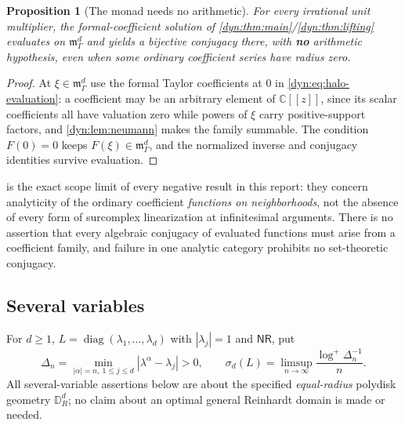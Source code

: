 \documentclass[11pt,letterpaper]{article}
\newtheorem{proposition}[proposition]{Proposition}
\theoremstyle{definition}
\theoremstyle{remark}
\newcommand{\C}{\mathbb C}
\newcommand{\m}{\mathfrak m}
\newcommand{\nres}{\mathsf{NR}}
\numberwithin{equation}{section}
\begin{document}
\begin{proposition}[The monad needs no arithmetic]\label{dyn:prop:monad}
For every irrational unit multiplier, the formal-coefficient solution of
\cref{dyn:thm:main}/\cref{dyn:thm:lifting} evaluates on $\m_\Gamma^{d}$ and
yields a \emph{bijective} conjugacy there, with \textbf{no} arithmetic
hypothesis, even when some ordinary coefficient series have radius zero.
\end{proposition}
\begin{proof}
At $\xi\in\m_\Gamma^{d}$ use the formal Taylor coefficients at $0$ in
\eqref{dyn:eq:halo-evaluation}: a coefficient may be an arbitrary element
of $\C[[z]]$, since its scalar coefficients all have valuation zero while
powers of $\xi$ carry positive-support factors, and
\cref{dyn:lem:neumann} makes the family summable. The condition $F(0)=0$
keeps $F(\xi)\in\m_\Gamma^{d}$, and the normalized inverse and conjugacy
identities survive evaluation.
\end{proof}

 is the exact scope limit of every negative result in
this report: they concern analyticity of the ordinary coefficient
\emph{functions on neighborhoods}, not the absence of every form of
surcomplex linearization at infinitesimal arguments. There is no assertion
that every algebraic conjugacy of evaluated functions must arise from a
coefficient family, and failure in one analytic category prohibits no
set-theoretic conjugacy.

\subsection{Several variables}
\label{dyn:subsec:several}

For $d\ge1$, $L=\operatorname{diag}(\lambda_1,\dots,\lambda_d)$ with
$|\lambda_j|=1$ and $\nres$, put
\begin{equation}\label{dyn:eq:multisigma}
 \Delta_n=\min_{|\alpha|=n,\ 1\le j\le d}|\lambda^{\alpha}-\lambda_j|>0,
 \qquad
 \sigma_d(L)=\limsup_{n\to\infty}\frac{\log^{+}\Delta_n^{-1}}{n}.
\end{equation}
All several-variable assertions below are about the specified
\emph{equal-radius} polydisk geometry $\mathbb D_R^{d}$; no claim about an
optimal general Reinhardt domain is made or needed.
\end{document}
